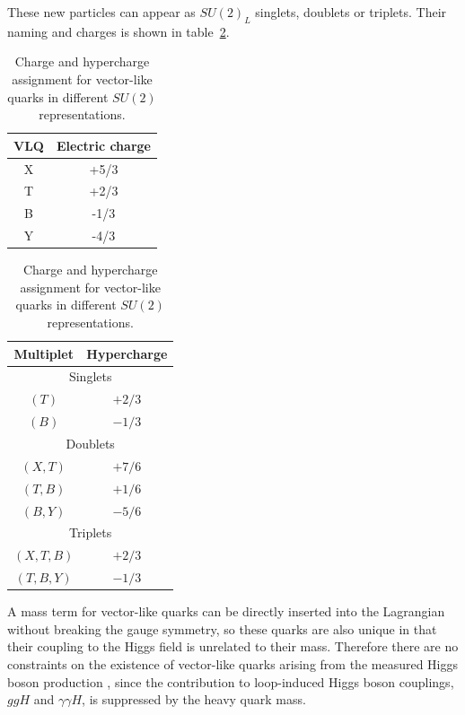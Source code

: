 These new particles can appear as $SU(2)_L$ singlets, doublets or triplets. Their naming and charges is shown in table~\ref{tab:VLQ_tuples}.
\begin{table}[tb]
  \centering
  \begin{minipage}{.4\textwidth}
    \begin{tabular}{cc}
      \toprule
      \toprule
      \textbf{VLQ} & \textbf{Electric charge} \\
      \midrule
      X   & +5/3  \\
      T   & +2/3  \\
      B   & -1/3  \\
      Y   & -4/3  \\
      \bottomrule
      \bottomrule
    \end{tabular}
  \end{minipage}
  \begin{minipage}{.4\textwidth}
    \begin{tabular}{cc}
      \toprule
      \toprule
      \textbf{Multiplet} & \textbf{Hypercharge} \\
      \midrule
      \multicolumn{2}{c}{ Singlets } \\
      $\left(T     \right)$   & $+2/3$  \\
      $\left(B     \right)$   & $-1/3$  \\
      \midrule
      \multicolumn{2}{c}{ Doublets } \\
      $\left(X,T   \right)$   & $+7/6$  \\
      $\left(T,B   \right)$   & $+1/6$  \\
      $\left(B,Y   \right)$   & $-5/6$  \\
      \midrule
      \multicolumn{2}{c}{ Triplets } \\
      $\left(X,T,B \right)$   & $+2/3$  \\
      $\left(T,B,Y \right)$   & $-1/3$  \\
      \bottomrule
      \bottomrule
    \end{tabular}
  \end{minipage}
  \caption{Charge and hypercharge assignment for vector-like quarks in different $SU(2)$ representations.}
  \label{tab:VLQ_tuples}
\end{table}
A mass term for vector-like quarks can be directly inserted into the Lagrangian without breaking the gauge symmetry, so these quarks are also unique in that their coupling to the Higgs field is unrelated to their mass. Therefore there are no constraints on the existence of vector-like quarks arising from the measured Higgs boson production \xsec, since the contribution to loop-induced Higgs boson couplings, $ggH$ and $\gamma\gamma H$, is suppressed by the heavy quark mass.

